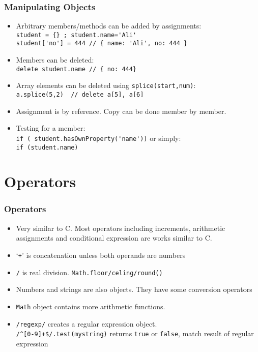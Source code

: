 \documentclass[trans,compress,xcolor=table]{beamer}
\begin{document}
\begin{frame}[fragile]
\frametitle{Manipulating Objects}
\begin{itemize}
\item Arbitrary members/methods can be added by assignments:\\
	\lstinline!student = {} ; student.name='Ali'!\\
	\lstinline!student['no'] = 444 // { name: 'Ali', no: 444 }!
\item Members can be deleted:\\
	\lstinline!delete student.name // { no: 444} !
\item Array elements can be deleted using 
	\lstinline!splice(start,num)!:\\
	\lstinline!a.splice(5,2)  // delete a[5], a[6]!
\item Assignment is by reference. Copy can be done member by member.
\item Testing for a member:\\
	\lstinline!if ( student.hasOwnProperty('name'))! or simply:\\
	\lstinline!if (student.name)!
\end{itemize}
\end{frame}

\section{Operators}
\begin{frame}
\frametitle{Operators}
\begin{itemize}
\item
Very similar to C. Most operators including  increments, arithmetic assignments and conditional expression
are works similar to C.
\item `\lstinline!+!' is concatenation unless both operands are numbers
\item \lstinline!/! is real division. \lstinline!Math.floor/celing/round()!
\item Numbers and strings are also objects. They have some
	conversion operators
\item \lstinline!Math! object contains more arithmetic functions.
\item \lstinline!/regexp/! creates a regular expression object.\\
	\lstinline!/^[0-9]+$/.test(mystring)! returns \lstinline!true!
	or \lstinline!false!, match result of regular expression 

\end{itemize}

\end{frame}
\end{document}
